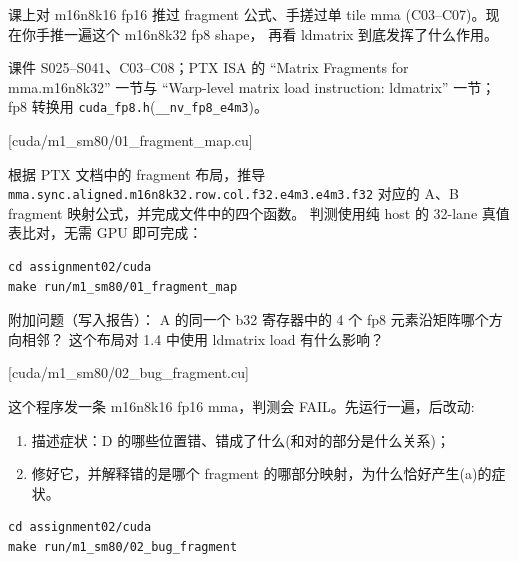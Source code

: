 \documentclass[11pt,a4paper,fontset=fandol]{ctexart}
\begin{document}
课上对 m16n8k16 fp16 推过 fragment 公式、手搓过单 tile mma
(C03--C07)。现在你手推一遍这个 m16n8k32 fp8 shape， 再看 ldmatrix
到底发挥了什么作用。

\begin{reading}

课件 S025--S041、C03--C08；PTX ISA 的 ``Matrix Fragments for
mma.m16n8k32'' 一节与 ``Warp-level matrix load instruction: ldmatrix''
一节；fp8 转换用 \texttt{cuda\_fp8.h}(\texttt{\_\_nv\_fp8\_e4m3})。

\end{reading}

[cuda/m1\_sm80/01\_fragment\_map.cu]

根据 PTX 文档中的 fragment 布局，推导
\texttt{mma.sync.aligned.m16n8k32.row.col.f32.e4m3.e4m3.f32} 对应的 A、B
fragment 映射公式，并完成文件中的四个函数。 判测使用纯 host 的 32-lane
真值表比对，无需 GPU 即可完成：

\begin{verbatim}
cd assignment02/cuda
make run/m1_sm80/01_fragment_map
\end{verbatim}

附加问题（写入报告）： A 的同一个 b32 寄存器中的 4 个 fp8
元素沿矩阵哪个方向相邻？ 这个布局对 1.4 中使用 ldmatrix load
有什么影响？

[cuda/m1\_sm80/02\_bug\_fragment.cu]

这个程序发一条 m16n8k16 fp16 mma，判测会 FAIL。先运行一遍，后改动:

\begin{enumerate}
\def\labelenumi{(\alph{enumi})}
\item
  描述症状：D 的哪些位置错、错成了什么(和对的部分是什么关系)；
\item
  修好它，并解释错的是哪个 fragment
  的哪部分映射，为什么恰好产生(a)的症状。
\end{enumerate}

\begin{verbatim}
cd assignment02/cuda
make run/m1_sm80/02_bug_fragment
\end{verbatim}
\end{document}
